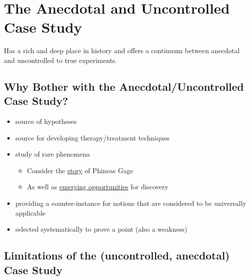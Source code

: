 \documentclass[
  english,
]{book}
\providecommand{\tightlist}{%
  \setlength{\itemsep}{0pt}\setlength{\parskip}{0pt}}
\begin{document}
\hypertarget{the-anecdotal-and-uncontrolled-case-study}{%
\section{The Anecdotal and Uncontrolled Case Study}\label{the-anecdotal-and-uncontrolled-case-study}}

Has a rich and deep place in history and offers a continuum between anecdotal and uncontrolled to true experiments.

\hypertarget{why-bother-with-the-anecdotaluncontrolled-case-study}{%
\subsection{Why Bother with the Anecdotal/Uncontrolled Case Study?}\label{why-bother-with-the-anecdotaluncontrolled-case-study}}

\begin{itemize}
\tightlist
\item
  source of hypotheses
\item
  source for developing therapy/treatment techniques
\item
  study of rare phenomena

  \begin{itemize}
  \tightlist
  \item
    Consider the \href{http://www.slate.com/articles/health_and_science/science/2014/05/phineas_gage_neuroscience_case_true_story_of_famous_frontal_lobe_patient.html}{story} of Phineas Gage\\
  \item
    As well as \href{http://www.npr.org/templates/story/story.php?storyId=113834285}{emerging opportunities} for discovery
  \end{itemize}
\item
  providing a counter-instance for notions that are considered to be universally applicable
\item
  selected systematically to prove a point (also a weakness)
\end{itemize}

\hypertarget{limitations-of-the-uncontrolled-anecdotal-case-study}{%
\subsection{Limitations of the (uncontrolled, anecdotal) Case Study}\label{limitations-of-the-uncontrolled-anecdotal-case-study}}
\end{document}
